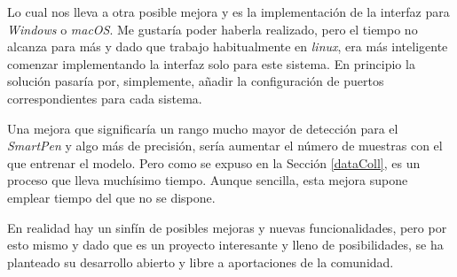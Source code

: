 Lo cual nos lleva a otra posible mejora y es la implementación de la interfaz
para \textit{Windows} o \textit{macOS}. Me gustaría poder haberla realizado, pero el tiempo
no alcanza para más y dado que trabajo habitualmente en \textit{linux},
era más inteligente comenzar implementando la interfaz solo para este sistema.
En principio la solución pasaría por, simplemente, añadir la configuración de
puertos correspondientes para cada sistema.

Una mejora que significaría un rango mucho mayor de detección para el \textit{SmartPen}
y algo más de precisión, sería aumentar el número de muestras con el que
entrenar el modelo. Pero como se expuso en la Sección \ref{dataColl}, es un proceso
que lleva muchísimo tiempo. Aunque sencilla, esta mejora supone emplear tiempo
del que no se dispone.

En realidad hay un sinfín de posibles mejoras y nuevas funcionalidades,
pero por esto mismo y dado que es un proyecto interesante y lleno de
posibilidades, se ha planteado su desarrollo abierto y libre a aportaciones de
la comunidad.